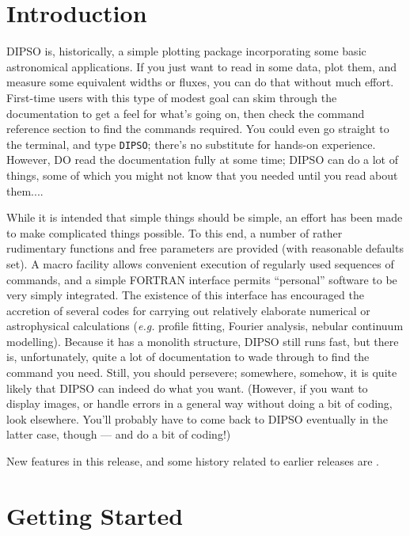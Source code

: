 \documentclass[twoside,11pt,noabs,nolof]{starlink}
\begin{document}
\scfrontmatter

\section {Introduction}

DIPSO is, historically, a simple plotting package incorporating some
basic astronomical applications. If you just want to read in some
data, plot them, and measure some equivalent widths or fluxes, you can
do that without much effort. First-time users with this type of modest
goal can skim through the documentation to get a feel for what's going
on, then check the command reference section to find the commands
required. You could even go straight to the terminal, and type {\texttt{DIPSO}};
there's no substitute for hands-on experience. However, DO read the
documentation fully at some time; DIPSO can do a lot of things, some
of which you might not know that you needed until you read about
them....

While it is intended that simple things should be simple, an effort
has been made to make complicated things possible. To this end, a
number of rather rudimentary functions and free parameters are
provided (with reasonable defaults set). A macro facility allows
convenient execution of regularly used sequences of commands, and a
simple FORTRAN interface permits ``personal'' software to be very
simply integrated. The existence of this interface has encouraged the
accretion of several codes for carrying out relatively elaborate
numerical or astrophysical calculations (\emph{e.g.} profile fitting,
Fourier analysis, nebular continuum modelling). Because it has a
monolith structure, DIPSO still runs fast, but there is,
unfortunately, quite a lot of documentation to wade through to find
the command you need. Still, you should persevere; somewhere, somehow,
it is quite likely that DIPSO can indeed do what you want. (However,
if you want to display images, or handle errors in a general way
without doing a bit of coding, look elsewhere. You'll probably have to
come back to DIPSO eventually in the latter case, though --- and do a
bit of coding!)

New features in this release, and some history related to earlier releases
are .


\section {Getting Started}
\end{document}
